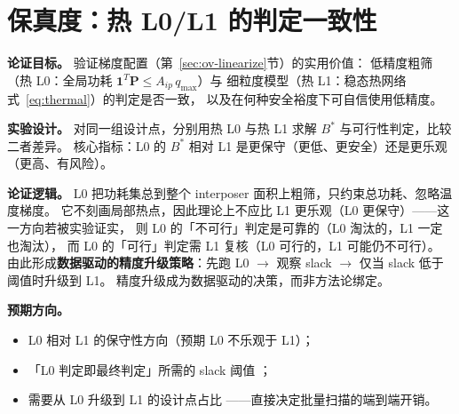 \section{保真度：热 L0/L1 的判定一致性}\label{sec:fidelity}

\textbf{论证目标。}
验证梯度配置（第~\ref{sec:ov-linearize}节）的实用价值：
低精度粗筛（热 L0：全局功耗 $\mathbf{1}^T\mathbf{P}\le A_{ip}\,q_{\max}$）与
细粒度模型（热 L1：稳态热网络式~\eqref{eq:thermal}）的判定是否一致，
以及在何种安全裕度下可自信使用低精度。

\textbf{实验设计。}
对同一组设计点，分别用热 L0 与热 L1 求解 $B^*$ 与可行性判定，比较二者差异。
核心指标：L0 的 $B^*$ 相对 L1 是更保守（更低、更安全）还是更乐观（更高、有风险）。

\textbf{论证逻辑。}
L0 把功耗集总到整个 interposer 面积上粗筛，只约束总功耗、忽略温度梯度。
它不刻画局部热点，因此理论上不应比 L1 更乐观（L0 更保守）——这一方向若被实验证实，
则 L0 的「不可行」判定是可靠的（L0 淘汰的，L1 一定也淘汰），
而 L0 的「可行」判定需 L1 复核（L0 可行的，L1 可能仍不可行）。
由此形成\textbf{数据驱动的精度升级策略}：先跑 L0 $\to$ 观察 slack $\to$ 仅当 slack 低于阈值时升级到 L1。
精度升级成为数据驱动的决策，而非方法论绑定。

\textbf{预期方向。}
\begin{itemize}
    \item L0 相对 L1 的保守性方向（预期 L0 不乐观于 L1）；
    \item 「L0 判定即最终判定」所需的 slack 阈值 ；
    \item 需要从 L0 升级到 L1 的设计点占比 ——直接决定批量扫描的端到端开销。
\end{itemize}
